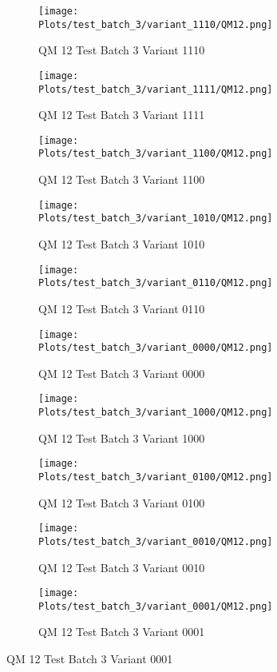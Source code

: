 \documentclass{DissertateFigs}
\begin{document}
\begin{figure}[t!]
    \begin{subfigure}{0.47\textwidth}
    \texttt{[image: Plots/test\_batch\_3/variant\_1110/QM12.png]}
    \caption{QM 12 Test Batch 3 Variant 1110}
    \end{subfigure}
    \begin{subfigure}{0.47\textwidth}
    \texttt{[image: Plots/test\_batch\_3/variant\_1111/QM12.png]}
    \caption{QM 12 Test Batch 3 Variant 1111}
    \end{subfigure}

\medskip

    \begin{subfigure}{0.47\textwidth}
    \texttt{[image: Plots/test\_batch\_3/variant\_1100/QM12.png]}
    \caption{QM 12 Test Batch 3 Variant 1100}
    \end{subfigure}
    \begin{subfigure}{0.47\textwidth}
    \texttt{[image: Plots/test\_batch\_3/variant\_1010/QM12.png]}
    \caption{QM 12 Test Batch 3 Variant 1010}
    \end{subfigure}

\medskip

    \begin{subfigure}{0.47\textwidth}
    \texttt{[image: Plots/test\_batch\_3/variant\_0110/QM12.png]}
    \caption{QM 12 Test Batch 3 Variant 0110}
    \end{subfigure}
    \begin{subfigure}{0.47\textwidth}
    \texttt{[image: Plots/test\_batch\_3/variant\_0000/QM12.png]}
    \caption{QM 12 Test Batch 3 Variant 0000}
    \end{subfigure}

\medskip

    \begin{subfigure}{0.47\textwidth}
    \texttt{[image: Plots/test\_batch\_3/variant\_1000/QM12.png]}
    \caption{QM 12 Test Batch 3 Variant 1000}
    \end{subfigure}
    \begin{subfigure}{0.47\textwidth}
    \texttt{[image: Plots/test\_batch\_3/variant\_0100/QM12.png]}
    \caption{QM 12 Test Batch 3 Variant 0100}
    \end{subfigure}

\medskip

    \begin{subfigure}{0.47\textwidth}
    \texttt{[image: Plots/test\_batch\_3/variant\_0010/QM12.png]}
    \caption{QM 12 Test Batch 3 Variant 0010}
    \end{subfigure}
    \begin{subfigure}{0.47\textwidth}
    \texttt{[image: Plots/test\_batch\_3/variant\_0001/QM12.png]}
    \caption{QM 12 Test Batch 3 Variant 0001}
    \end{subfigure}


\end{figure}
\end{document}
